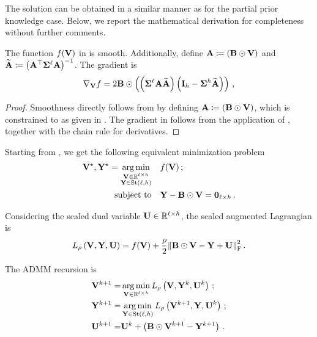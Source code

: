 The solution can be obtained in a similar manner as for the partial prior knowledge case.
Below, we report the mathematical derivation for completeness without further comments.

\begin{corollary}\label{corollary:objective_full_knowledge}
    The function $f(\mathbf{V})$ in  is smooth.
    Additionally, define $\mathbf{A}\coloneqq\left(\mathbf{B} \odot \mathbf{V}\right)$ and $\widetilde{\mathbf{A}}\coloneqq\left(\mathbf{A}^\top \boldsymbol{\Sigma}^{\ell} \mathbf{A}\right)^{-1}$.
    The gradient is
    \begin{equation}\label{eq:gradV_full}
        \nabla_{\mathbf{V}} f = 2\mathbf{B} \odot  \left(\left(\boldsymbol{\Sigma}^{\ell}\mathbf{A}\widetilde{\mathbf{A}}\right)\left(\mathbf{I}_h - \boldsymbol{\Sigma}^{h}\widetilde{\mathbf{A}}\right)\right)\,,
    \end{equation}
\end{corollary}
\begin{proof}
    Smoothness directly follows from  by defining $\mathbf{A}\coloneqq\left(\mathbf{B} \odot \mathbf{V}\right)$, which is constrained to  as given in .
    The gradient in  follows from the application of , together with the chain rule for derivatives. 
\end{proof}

Starting from , we get the following equivalent minimization problem
\begin{equation}\label{eq:prob_madmmsca_V_with_splitting}
    \begin{aligned}
        \mathbf{V}^\star, \mathbf{Y}^\star = \operatorname*{arg\,min}_{\substack{\mathbf{V} \in \mathbb{R}^{\ell \times h}\\ \mathbf{Y} \in \mathrm{St}({\ell},{h}) \\}} &\quad f(\mathbf{V})\,;\\
         \textrm{subject to} & \quad \mathbf{Y} - \mathbf{B} \odot \mathbf{V} = \boldsymbol{0}_{\ell \times h}\,.
    \end{aligned}
\end{equation}

Considering the scaled dual variable $\mathbf{U} \in\mathbb{R}^{\ell \times h}$, the scaled augmented Lagrangian is
\begin{equation}\label{eq:scaledAUL_full}
    L_\rho\left(\mathbf{V},\mathbf{Y},\mathbf{U}\right)=f(\mathbf{V}) + \frac{\rho}{2}\norm{\mathbf{B}\odot\mathbf{V} - \mathbf{Y} +\mathbf{U}}_{\mathrm{F}}^2 \,.
\end{equation}

The ADMM recursion is
\begin{equation}\label{eq:ADMM_full}
    \begin{aligned}        
        \mathbf{V}^{k+1}=&\operatorname*{arg\,min}_{\mathbf{V} \in \mathbb{R}^{\ell \times h}} L_\rho\left(\mathbf{V},\mathbf{Y}^k,\mathbf{U}^k\right)\,;\\
        \mathbf{Y}^{k+1}=&\operatorname*{arg\,min}_{\mathbf{Y} \in \mathrm{St}({\ell},{h})} L_\rho\left(\mathbf{V}^{k+1},\mathbf{Y},\mathbf{U}^k\right)\,;\\
        \mathbf{U}^{k+1}=&\mathbf{U}^k + \left(\mathbf{B}\odot\mathbf{V}^{k+1} - \mathbf{Y}^{k+1}\right)\,.\\
    \end{aligned}
\end{equation}

